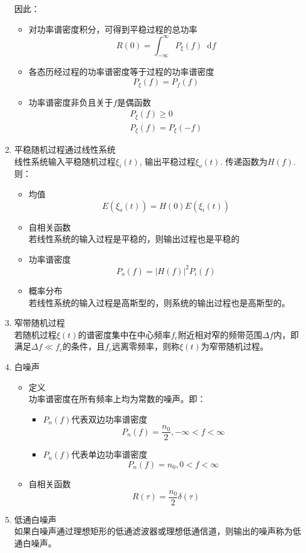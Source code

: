 \documentclass[UTF8]{ctexrep}
\newcommand{\dif}{\mathop{}\!{}\mathrm{d}}
\def\pth#1{\left( {#1}\right)}
\begin{document}
\begin{enumerate}
因此：
\begin{itemize}
\item 对功率谱密度积分，可得到平稳过程的总功率
\[R(0)=\int_{-\infty}^{\infty}P_{\xi}(f)\dif f\]
\item 各态历经过程的功率谱密度等于过程的功率谱密度
\[P_{\xi}(f)=P_f(f)\]
\item 功率谱密度非负且关于$f$是偶函数
\begin{gather*}
P_{\xi}(f)\geq 0\\
P_{\xi}(f)=P_{\xi}(-f)
\end{gather*}
\end{itemize}
\item 平稳随机过程通过线性系统\\
线性系统输入平稳随机过程$\xi_i(t)$, 输出平稳过程$\xi_o(t)$. 传递函数为$H(f)$. 则：
\begin{itemize}
\item 均值
\[E\pth{\xi_o(t)}=H(0)E\pth{\xi_i(t)}\]
\item 自相关函数\\
若线性系统的输入过程是平稳的，则输出过程也是平稳的
\item 功率谱密度
\[P_o(f)=|H(f)|^2P_i(f)\]
\item 概率分布\\
若线性系统的输入过程是高斯型的，则系统的输出过程也是高斯型的。
\end{itemize}
\item 窄带随机过程\\
若随机过程$\xi(t)$的谱密度集中在中心频率$f_c$附近相对窄的频带范围$\Delta f$内，即满足$\Delta f\ll f_c$的条件，且$f_c$远离零频率，则称$\xi(t)$为窄带随机过程。
\item 白噪声
\begin{itemize}
\item 定义\\
功率谱密度在所有频率上均为常数的噪声。即：
\begin{itemize}
\item $P_n(f)$代表双边功率谱密度
\[P_n(f)=\frac{n_0}{2}, -\infty < f <\infty\]
\item $P_n(f)$代表单边功率谱密度
\[P_n(f)=n_0, 0< f<\infty\]
\end{itemize}
\item 自相关函数
\[R\pth{\tau}=\frac{n_0}{2}\delta\pth{\tau}\]
\end{itemize}
\item 低通白噪声\\
如果白噪声通过理想矩形的低通滤波器或理想低通信道，则输出的噪声称为低通白噪声。\par

\end{enumerate}
\end{document}
